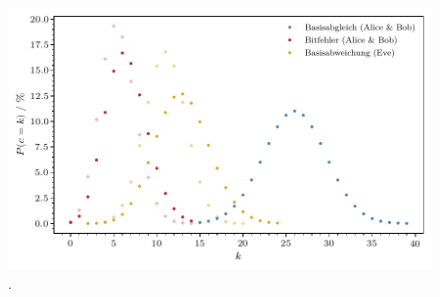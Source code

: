 \begin{figure}[H]
	\includegraphics{build/verteilung.pdf}
	\caption{.}
	\label{fig:verteilung}
\end{figure}










